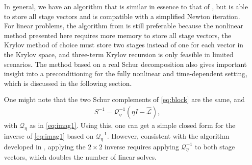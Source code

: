 \documentclass[review]{siamart}
\begin{document}
In general, we have an algorithm that is similar in essence to that of ,
but is able to store all stage vectors and is compatible with a simplified Newton
iteration. For linear problems, the algorithm from  is still
preferable because the nonlinear method presented here requires more memory to
store all stage vectors, the Krylov method of choice must store two stages instead
of one for each vector in the Krylov space, and three-term Krylov recursion is
only feasible in limited scenarios. The method based on a real Schur decomposition
also gives important insight into a preconditioning for the fully nonlinear
and time-dependent setting, which is discussed in the following section. 

%
\begin{remark}
One might note that the two Schur complements of \eqref{eq:block} are the same, and
\begin{align*}
S^{-1} = \mathcal{Q}_\eta^{-1}(\eta I - \widehat{\mathcal{L}}),
\end{align*}
with $\mathcal{Q}_\eta$ as in \eqref{eq:imag1}. Using this, one can get a simple
closed form for the inverse of \eqref{eq:imag1} based on $\mathcal{Q}_\eta^{-1}$.
However, consistent with the algorithm developed in , applying the
$2\times 2$ inverse requires applying $\mathcal{Q}_\eta^{-1}$ to both stage vectors,
which doubles the number of linear solves. 
\end{remark}
%
\end{document}
